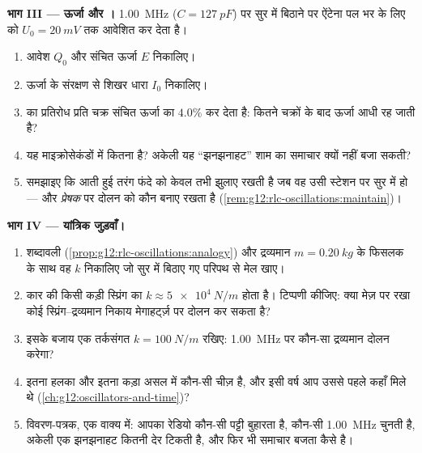 \begin{problem}
\medskip
\noindent\textbf{भाग III --- ऊर्जा और ।}
\qty{1.00}{MHz} ($C = \qty{127}{pF}$) पर सुर में बिठाने पर ऐंटेना पल भर के लिए
 को $U_0 = \qty{20}{mV}$ तक आवेशित कर देता है।
\begin{enumerate}[resume]
  \item आवेश $Q_0$ और संचित ऊर्जा $E$ निकालिए।
  \item ऊर्जा के संरक्षण से शिखर धारा $I_0$ निकालिए।
  \item {} का प्रतिरोध प्रति चक्र संचित ऊर्जा
        का $4.0\%$  कर देता है: कितने चक्रों के बाद ऊर्जा आधी रह
        जाती है?
  \item यह माइक्रोसेकंडों में कितना है? अकेली यह ``झनझनाहट'' शाम का समाचार
        क्यों नहीं बजा सकती?
  \item समझाइए कि आती हुई तरंग फंदे को केवल तभी झुलाए रखती है जब वह
        उसी स्टेशन पर सुर में हो --- और \emph{प्रेषक} पर दोलन को कौन बनाए
        रखता है (\cref{rem:g12:rlc-oscillations:maintain})।
\end{enumerate}

\medskip
\noindent\textbf{भाग IV --- यांत्रिक जुड़वाँ।}
\begin{enumerate}[resume]
  \item शब्दावली (\cref{prop:g12:rlc-oscillations:analogy}) और द्रव्यमान $m = \qty{0.20}{kg}$ के फिसलक के साथ वह
         $k$ निकालिए जो सुर में बिठाए गए परिपथ से मेल खाए।
  \item कार की किसी कड़ी स्प्रिंग का $k \approx \qty{5e4}{N/m}$ होता है। टिप्पणी कीजिए: क्या
        मेज़ पर रखा कोई स्प्रिंग--द्रव्यमान निकाय मेगाहर्ट्ज़ पर दोलन कर सकता
        है?
  \item इसके बजाय एक तर्कसंगत $k = \qty{100}{N/m}$ रखिए: \qty{1.00}{MHz} पर कौन-सा द्रव्यमान दोलन
        करेगा?
  \item इतना हलका और इतना कड़ा  असल में कौन-सी चीज़ है,
        और इसी वर्ष आप उससे पहले कहाँ मिले थे (\cref{ch:g12:oscillators-and-time})?
  \item विवरण-पत्रक, एक वाक्य में: आपका रेडियो कौन-सी पट्टी बुहारता है,
        कौन-सी  \qty{1.00}{MHz} चुनती है, अकेली एक झनझनाहट कितनी देर
        टिकती है, और फिर भी समाचार बजता कैसे है।
\end{enumerate}
\end{problem}
